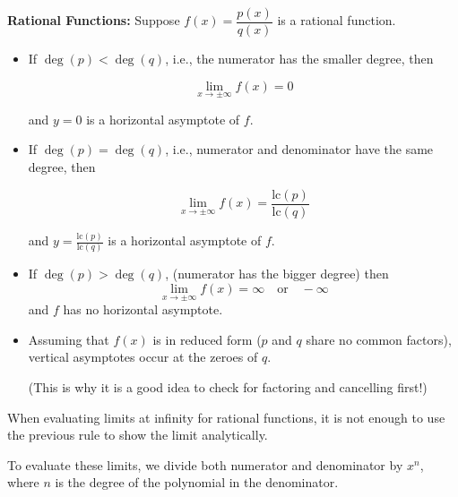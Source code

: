 \documentclass[Cal1Spr16Lectures.tex]{subfiles}
\begin{document}
\begin{frame}\footnotesize
{\bf Rational Functions:}  Suppose $f(x)=\dfrac{p(x)}{q(x)}$ is a rational function.

\begin{itemize}
\item If $\deg(p)<\deg(q)$, i.e., \alert{the numerator has the smaller degree}, then 

\vspace{-1pc}
\[\lim_{x\to\pm\infty}f(x)=0\] 

\vspace{-0.5pc}
and $y=0$ is a horizontal asymptote of $f$.

\vspace{0.5pc}
\item If $\deg(p)=\deg(q)$, i.e., \alert{numerator and denominator have the same degree}, then 

\vspace{-1.5pc}
\[\lim_{x\to\pm\infty}f(x)=\dfrac{\text{lc}(p)}{\text{lc}(q)}\] 

\vspace{-0.5pc}
and $y=\textstyle\frac{\text{lc}(p)}{\text{lc}(q)}$ is a horizontal asymptote of $f$.
\end{itemize}
\end{frame}

\begin{frame}\footnotesize
\begin{itemize}
\item If $\deg(p)>\deg(q)$, \alert{(numerator has the bigger degree)} then 
\[\lim_{x\to\pm\infty}f(x)=\infty\quad\text{or}\quad -\infty\] 
and $f$ has no horizontal asymptote.

\vspace{0.5pc}
\item Assuming that $f(x)$ is in \alert{reduced form} ($p$ and $q$ share no common factors), vertical asymptotes occur at the zeroes of $q$.  

\vspace{0.5pc}
(This is why it is a good idea to check for factoring and cancelling first!)
\end{itemize}
\end{frame}

\begin{frame}%
When evaluating limits at infinity for rational functions, it is not enough to use the previous rule to show the limit analytically.

\vspace{1pc}
To evaluate these limits, we divide both numerator and denominator by $x^n$, where $n$ is the degree of the polynomial in the denominator.

\end{frame}
\end{document}
